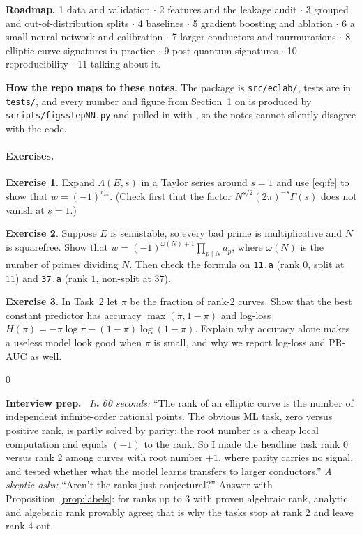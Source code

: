 \documentclass[11pt]{article}
\theoremstyle{definition}
\newtheorem{exercise}{Exercise}[section]
\theoremstyle{plain}
\theoremstyle{remark}
\newcommand{\code}[1]{\texttt{#1}}
\renewcommand{\_}{\oldunderscore\allowbreak}
\newcommand{\file}[1]{\textcolor{blue!50!black}{\texttt{#1}}}
\newenvironment{interview}
  {\par\medskip\noindent\begin{lrbox}{0}\begin{minipage}{\dimexpr\linewidth-2\fboxsep-2\fboxrule\relax}
   \textbf{Interview prep.}\ }
  {\end{minipage}\end{lrbox}\fcolorbox{blue!40!black}{interviewbg}{\usebox{0}}\par\medskip}
\begin{document}
\medskip\noindent\textbf{Roadmap.} 1 data and validation $\cdot$ 2 features and the leakage
audit $\cdot$ 3 grouped and out-of-distribution splits $\cdot$ 4 baselines $\cdot$ 5 gradient
boosting and ablation $\cdot$ 6 a small neural network and calibration $\cdot$ 7 larger
conductors and murmurations $\cdot$ 8 elliptic-curve signatures in practice $\cdot$
9 post-quantum signatures $\cdot$ 10 reproducibility $\cdot$ 11 talking about it.

\medskip\noindent\textbf{How the repo maps to these notes.} The package is \file{src/eclab/},
tests are in \file{tests/}, and every number and figure from Section~1 on is produced by
\file{scripts/figs\_stepNN.py} and pulled in with \verb||, so the notes cannot silently
disagree with the code.

\paragraph{Exercises.}
\begin{exercise}\label{ex:parity}
Expand $\Lambda(E,s)$ in a Taylor series around $s=1$ and use \eqref{eq:fe} to show that
$w=(-1)^{r_{\mathrm{an}}}$. (Check first that the factor $N^{s/2}(2\pi)^{-s}\Gamma(s)$ does not
vanish at $s=1$.)
\end{exercise}
\begin{exercise}\label{ex:semistable}
Suppose $E$ is semistable, so every bad prime is multiplicative and $N$ is squarefree. Show
that $w=(-1)^{\omega(N)+1}\prod_{p\mid N}a_p$, where $\omega(N)$ is the number of primes
dividing $N$. Then check the formula on \code{11.a} (rank $0$, split at $11$) and \code{37.a}
(rank $1$, non-split at $37$).
\end{exercise}
\begin{exercise}\label{ex:baseline}
In Task~2 let $\pi$ be the fraction of rank-$2$ curves. Show that the best constant predictor
has accuracy $\max(\pi,1-\pi)$ and log-loss $H(\pi)=-\pi\log\pi-(1-\pi)\log(1-\pi)$. Explain
why accuracy alone makes a useless model look good when $\pi$ is small, and why we report
log-loss and PR-AUC as well.
\end{exercise}

\begin{interview}
\emph{In 60 seconds:} ``The rank of an elliptic curve is the number of independent infinite-order
rational points. The obvious ML task, zero versus positive rank, is partly solved by parity:
the root number is a cheap local computation and equals $(-1)$ to the rank. So I made the
headline task rank 0 versus rank 2 among curves with root number $+1$, where parity carries
no signal, and tested whether what the model learns transfers to larger conductors.''
\emph{A skeptic asks:} ``Aren't the ranks just conjectural?'' Answer with
Proposition~\ref{prop:labels}: for ranks up to $3$ with proven algebraic rank, analytic and
algebraic rank provably agree; that is why the tasks stop at rank $2$ and leave rank $4$ out.
\end{interview}
\end{document}

